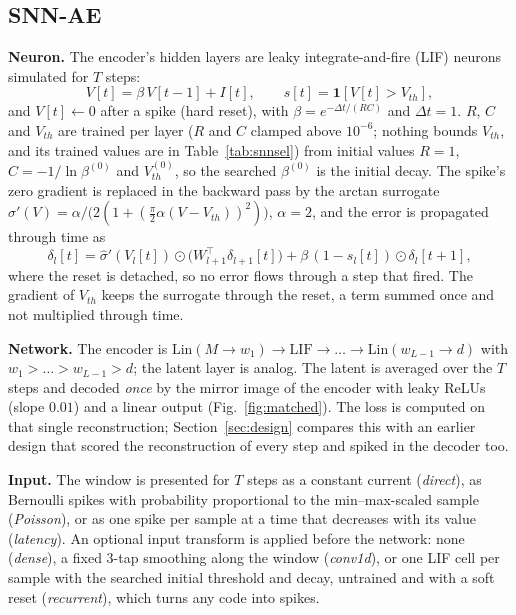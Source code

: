 \documentclass[conference]{IEEEtran}
\begin{document}
\subsection{SNN-AE}
\label{sec:snn}
\par \textbf{Neuron.} The encoder's hidden layers are leaky integrate-and-fire (LIF) neurons
\cite{gerstner2002spiking} simulated for $T$ steps:
\begin{equation}
  V[t] = \beta\,V[t-1] + I[t],\qquad s[t] = \mathbf{1}[V[t]> V_{th}],
  \label{eq:lif}
\end{equation}
and $V[t]\leftarrow 0$ after a spike (hard reset),
with $\beta=e^{-\Delta t/(RC)}$ and $\Delta t=1$. $R$, $C$ and $V_{th}$ are trained per layer
($R$ and $C$ clamped above $10^{-6}$; nothing bounds $V_{th}$, and its trained values are in
Table~\ref{tab:snnsel}) from initial values $R=1$, $C=-1/\ln\beta^{(0)}$ and
$V_{th}^{(0)}$, so the searched $\beta^{(0)}$ is the initial decay. The spike's zero gradient
is replaced in the backward pass by the arctan surrogate \cite{eshraghian2023training}
$\hat\sigma'(V)=\alpha/\big(2(1+(\tfrac{\pi}{2}\alpha(V-V_{th}))^2)\big)$, $\alpha=2$, and the
error is propagated through time as
\begin{equation}
  \delta_l[t] = \hat\sigma'(V_l[t])\odot\big(W_{l+1}^{\top}\delta_{l+1}[t]\big)
                + \beta\,(1-s_l[t])\odot\delta_l[t+1],
\end{equation}
where the reset is detached, so no error flows through a step that fired. The gradient of
$V_{th}$ keeps the surrogate through the reset, a term summed once and not multiplied through
time.

\par \textbf{Network.} The encoder is $\mathrm{Lin}(M{\to}w_1)\to\mathrm{LIF}\to\dots\to
\mathrm{Lin}(w_{L-1}{\to}d)$ with $w_1>\dots>w_{L-1}>d$; the latent layer is analog. The
latent is averaged over the $T$ steps and decoded \emph{once} by the mirror image of the
encoder with leaky ReLUs (slope $0.01$) and a linear output (Fig.~\ref{fig:matched}). The loss
is computed on that single reconstruction; Section~\ref{sec:design} compares this with an
earlier design that scored the reconstruction of every step and spiked in the decoder too.

\par \textbf{Input.} The window is presented for $T$ steps as a constant current
(\emph{direct}), as Bernoulli spikes with probability proportional to the min--max-scaled
sample (\emph{Poisson}), or as one spike per sample at a time that decreases with its value
(\emph{latency}). An optional input transform is applied before the network: none
(\emph{dense}), a fixed 3-tap smoothing along the window (\emph{conv1d}), or one LIF cell
per sample with the searched initial threshold and decay, untrained and with a soft reset
(\emph{recurrent}), which turns any code into spikes.
\end{document}
